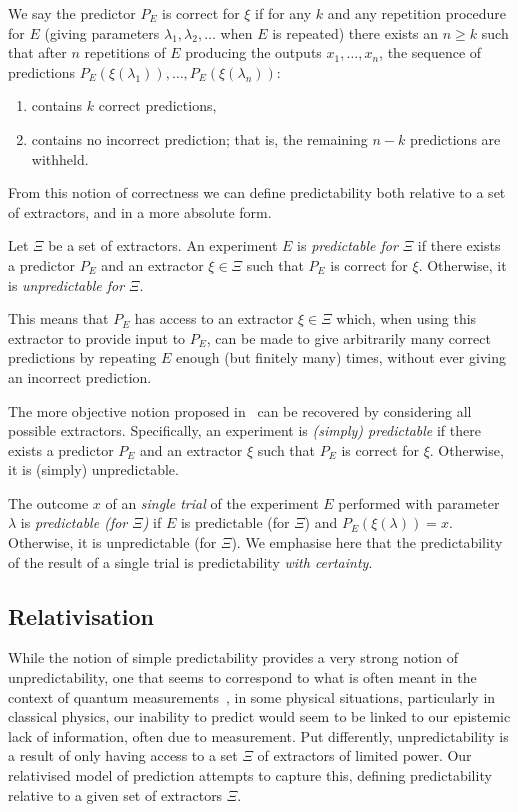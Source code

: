 \documentclass[information,article,submit,moreauthors,pdftex,12pt,a4paper]{mdpi}
\theoremstyle{mdpi}
\newcounter{ex}
\newcounter{re}
\theoremstyle{mdpidefinition}
\begin{document}
We say the predictor $P_E$ is correct for $\xi$ if for any $k$ and any repetition procedure for $E$ (giving parameters $\lambda_1, \lambda_2, \dots$ when $E$ is repeated) there exists an $n\ge k$ such that after $n$ repetitions of $E$ producing the outputs $x_1,\dots,x_n$, the sequence of predictions $P_E(\xi(\lambda_1)),\dots,P_E(\xi(\lambda_n))$:
\begin{enumerate}
	\item contains $k$ correct predictions,
	\item contains no incorrect prediction; that is, the remaining $n-k$ predictions are withheld.
\end{enumerate}


From this notion of correctness we can define predictability both relative to a set of extractors, and in a more absolute form.

Let $\Xi$ be a set of extractors.
An experiment $E$ is \emph{predictable for $\Xi$} if there exists a predictor $P_E$ and an extractor $\xi\in\Xi$ such that $P_E$ is correct for $\xi$.
Otherwise, it is \emph{unpredictable for $\Xi$}.

This means that $P_E$ has access to an extractor $\xi\in\Xi$ which, when using this extractor to provide input to $P_E$, can be made to give arbitrarily many correct predictions by repeating $E$ enough (but finitely many) times, without ever giving an incorrect prediction.

The more objective notion proposed in~\cite{DBLP:conf/birthday/AbbottCS15} can be recovered by considering all possible extractors.
Specifically, an experiment is \emph{(simply) predictable} if there exists a predictor $P_E$ and an extractor $\xi$ such that $P_E$ is correct for $\xi$.
Otherwise, it is (simply) unpredictable.

The outcome $x$ of an \emph{single trial} of the experiment $E$ performed with parameter $\lambda$ is \emph{predictable (for $\Xi$)} if $E$ is predictable (for $\Xi$) and $P_E(\xi(\lambda))=x$.
Otherwise, it is unpredictable (for $\Xi$).
We emphasise here that the predictability of the result of a single trial is predictability \emph{with certainty}.


\subsection{Relativisation}

While the notion of simple predictability provides a very strong notion of unpredictability, one that seems to correspond to what is often meant in the context of quantum measurements~\cite{DBLP:conf/birthday/AbbottCS15}, in some physical situations, particularly in classical physics, our inability to predict would seem to be linked to our epistemic lack of information, often due to measurement.
Put differently, unpredictability is a result of only having access to a set $\Xi$ of extractors of limited power.
Our relativised model of prediction attempts to capture this, defining predictability relative to a given set of extractors $\Xi$.
\end{document}
